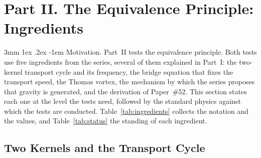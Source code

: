 \documentclass[%
 reprint, amsmath,amssymb, aps, prb, ]{revtex4-2}
\makeatletter
\numberwithin{equation}{section}
\renewcommand\paragraph{%
  \@startsection{paragraph}{4}{\z@}%
    {3mm \@plus 1ex \@minus .2ex}%
    {-1em}%
    {\normalfont\normalsize\itshape}}
\makeatother
\begin{document}
\section{Part II. The Equivalence Principle: Ingredients}
\label{sec:primer}

\paragraph{Motivation.} Part~II tests the equivalence principle. Both tests use five ingredients from the series, several of them explained in Part~I: the two-kernel transport cycle and its frequency, the bridge equation that fixes the transport speed, the Thomas vortex, the mechanism by which the series proposes that gravity is generated, and the derivation of Paper~\#52. This section states each one at the level the tests need, followed by the standard physics against which the tests are conducted. Table~\ref{tab:ingredients} collects the notation and the values, and Table~\ref{tab:status} the standing of each ingredient.

\subsection{Two Kernels and the Transport Cycle}
\label{subsec:primer_cycle}
\end{document}
